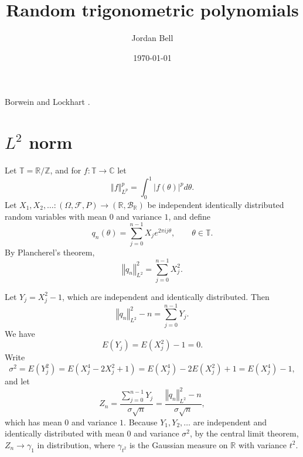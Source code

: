 \documentclass{amsart}
\newcommand{\norm}[1]{\left\Vert #1 \right\Vert}
\begin{document}
\title{Random trigonometric polynomials}
\author{Jordan Bell}
\address{Department of Mathematics, University of Toronto, Toronto, Ontario, Canada}
\date{\today}
\maketitle


Borwein and Lockhart \cite{MR1814174}. 

\section{$L^2$ norm}
Let $\mathbb{T}=\mathbb{R}/\mathbb{Z}$, and for $f:\mathbb{T} \to \mathbb{C}$ let
\[
\norm{f}_{L^p}^p =  \int_0^1 |f(\theta)|^p d\theta.
\]
Let $X_1,X_2,\ldots:(\Omega,\mathscr{F},P) \to (\mathbb{R},\mathscr{B}_{\mathbb{R}})$ be 
independent identically distributed random variables with mean $0$ and variance $1$, and define
\[
q_n(\theta) = \sum_{j=0}^{n-1} X_j e^{2\pi ij\theta},\qquad \theta \in \mathbb{T}.
\]
By Plancherel's theorem,
\[
\norm{q_n}_{L^2}^2 = \sum_{j=0}^{n-1} X_j^2.
\]

Let $Y_j=X_j^2-1$, which are independent and identically distributed.
Then
\[
\norm{q_n}_{L^2}^2-n = \sum_{j=0}^{n-1} Y_j.
\]
We have
\[
E(Y_j) = E(X_j^2)-1 = 0.
\]
Write
\[
\sigma^2 = E(Y_j^2) = E(X_j^4-2X_j^2+1) = E(X_j^4) - 2E(X_j^2) + 1 = E(X_j^4) - 1,
\]
and let
\[
Z_n =
\frac{\sum_{j=0}^{n-1} Y_j}{\sigma \sqrt{n}}
= \frac{\norm{q_n}_{L^2}^2-n}{\sigma \sqrt{n}},
\]
which has mean $0$ and variance $1$. 
Because $Y_1,Y_2,\ldots$ are independent and identically distributed with mean $0$ and variance $\sigma^2$,
by the central limit theorem, $Z_n \to \gamma_1$ in distribution, where $\gamma_{t^2}$ is the Gaussian measure
on $\mathbb{R}$ with variance $t^2$. 
\end{document}

